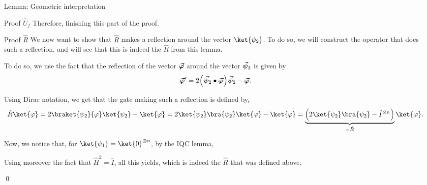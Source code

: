 \documentclass[a4paper]{article}
\begin{document}
\begin{parag}{Lemma: Geometric interpretation}
\begin{subparag}{Proof $\hat{U}_f$}
        Therefore, 
        finishing this part of the proof.
    \end{subparag}

    \begin{subparag}{Proof $\hat{R}$}
        We now want to show that $\hat{R}$ makes a reflection around the vector $\ket{\psi_2}$. To do so, we will construct the operator that does such a reflection, and will see that this is indeed the $\hat{R}$ from this lemma.

        To do so, we use the fact that the reflection of the vector $\bm{\protect\vec{\varphi}}$ around the vector $\bm{\protect\vec{\psi}}_2$ is given by 
        \[\bvec{\phi}' = 2 \left(\bvec{\psi}_2 \dotprod \bvec{\phi}\right) \bvec{\psi}_2 - \bvec{\phi}.\]

        Using Dirac notation, we get that the gate making such a reflection is defined by, 
        \[\hat{R} \ket{\phi} = 2 \braket{\psi_2}{\phi} \ket{\psi_2} - \ket{\phi} = 2 \ket{\psi_2}\bra{\psi_2} \ket{\phi} - \ket{\phi} = \underbrace{\left(2 \ket{\psi_2}\bra{\psi_2} - \hat{I}^{\otimes n}\right)}_{= \hat{R}} \ket{\phi}.\]

        Now, we notice that, for $\ket{\psi_1} = \ket{0}^{\otimes n}$, by the IQC lemma,
        
        Using moreover the fact that $\hat{H}^2 = \hat{I}$, all this yields,
        which is indeed the $\hat{R}$ that was defined above.

        \qed
    \end{subparag}
\end{parag}
\end{document}
